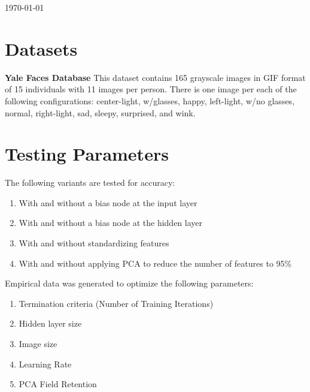 \documentclass[12pt]{article}
\begin{document}
\begin{titlepage}

{\large \today}\\[3cm] %




\vfill %
\end{titlepage}

\newpage

\section{Datasets}
\textbf{Yale Faces Database} \quad This dataset contains 165 grayscale images in GIF format of 15 individuals with 11 images per person. There is one image per each of the following configurations: center-light, w/glasses, happy, left-light, w/no glasses, normal, right-light, sad, sleepy, surprised, and wink.

\section{Testing Parameters}
The following variants are tested for accuracy:
\begin{enumerate}
  \item With and without a bias node at the input layer
  \item With and without a bias node at the hidden layer
  \item With and without standardizing features
  \item With and without applying PCA to reduce the number of features to 95\%
\end{enumerate}
Empirical data was generated to optimize the following parameters:
\begin{enumerate}
  \item Termination criteria (Number of Training Iterations)
  \item Hidden layer size
  \item Image size
  \item Learning Rate
  \item PCA Field Retention
\end{enumerate}
\end{document}
